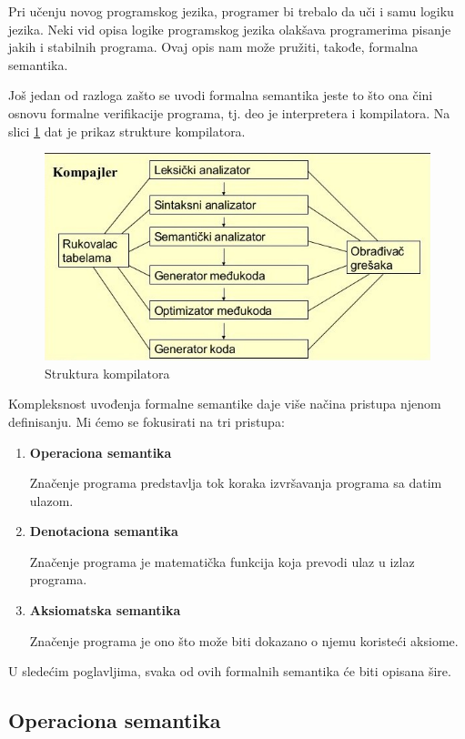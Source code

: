 \documentclass[a4paper]{article}
\begin{document}
{Pri učenju novog programskog jezika, programer bi trebalo da uči i samu logiku jezika. Neki vid opisa logike programskog jezika olakšava programerima pisanje jakih i stabilnih programa.  Ovaj opis nam može pružiti, takođe, formalna semantika.

Još jedan od razloga zašto se uvodi formalna semantika jeste to što ona čini osnovu formalne verifikacije programa, tj. deo je interpretera i kompilatora. Na slici \ref{fig:kompilator} dat je prikaz strukture kompilatora.

\begin{figure}[h!]
\begin{center}
\includegraphics[scale=0.5]{kompajler.jpg}
\end{center}
\caption{Struktura kompilatora \cite{slika}}
\label{fig:kompilator}
\end{figure}

Kompleksnost uvođenja formalne semantike daje više načina pristupa njenom definisanju. Mi ćemo se fokusirati na tri pristupa:
\begin{enumerate}
  \item \textbf{Operaciona semantika}

  Značenje programa predstavlja tok koraka izvršavanja programa sa datim ulazom.
  \item \textbf{Denotaciona semantika}

  Značenje programa je matematička funkcija koja prevodi ulaz u izlaz programa.
  \item \textbf{Aksiomatska semantika}

  Značenje programa je ono što može biti dokazano o njemu koristeći aksiome.
\end{enumerate}

U sledećim poglavljima, svaka od ovih formalnih semantika će biti opisana šire.
\subsection{Operaciona semantika}
\label{sec:opsem}

}
\end{document}
